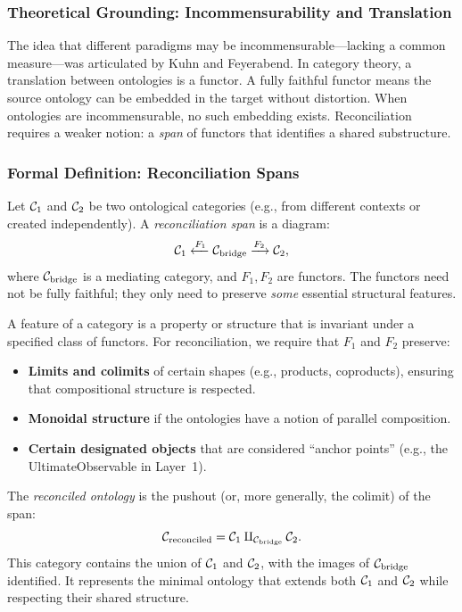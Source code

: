 \subsubsection{Theoretical Grounding: Incommensurability and Translation}
The idea that different paradigms may be incommensurable—lacking a common measure—was articulated by Kuhn and Feyerabend. In category theory, a translation between ontologies is a functor. A fully faithful functor means the source ontology can be embedded in the target without distortion. When ontologies are incommensurable, no such embedding exists. Reconciliation requires a weaker notion: a \emph{span} of functors that identifies a shared substructure.

\subsubsection{Formal Definition: Reconciliation Spans}
\begin{definition}
Let $\mathcal{C}_1$ and $\mathcal{C}_2$ be two ontological categories (e.g., from different contexts or created independently). A \emph{reconciliation span} is a diagram:
\[
\mathcal{C}_1 \xleftarrow{F_1} \mathcal{C}_{\text{bridge}} \xrightarrow{F_2} \mathcal{C}_2,
\]
where $\mathcal{C}_{\text{bridge}}$ is a mediating category, and $F_1, F_2$ are functors. The functors need not be fully faithful; they only need to preserve \emph{some} essential structural features.
\end{definition}

\begin{definition}
A feature of a category is a property or structure that is invariant under a specified class of functors. For reconciliation, we require that $F_1$ and $F_2$ preserve:
\begin{itemize}
    \item \textbf{Limits and colimits} of certain shapes (e.g., products, coproducts), ensuring that compositional structure is respected.
    \item \textbf{Monoidal structure} if the ontologies have a notion of parallel composition.
    \item \textbf{Certain designated objects} that are considered ``anchor points'' (e.g., the UltimateObservable in Layer~1).
\end{itemize}
\end{definition}

\begin{definition}
The \emph{reconciled ontology} is the pushout (or, more generally, the colimit) of the span:
\[
\mathcal{C}_{\text{reconciled}} = \mathcal{C}_1 \amalg_{\mathcal{C}_{\text{bridge}}} \mathcal{C}_2.
\]
This category contains the union of $\mathcal{C}_1$ and $\mathcal{C}_2$, with the images of $\mathcal{C}_{\text{bridge}}$ identified. It represents the minimal ontology that extends both $\mathcal{C}_1$ and $\mathcal{C}_2$ while respecting their shared structure.
\end{definition}

